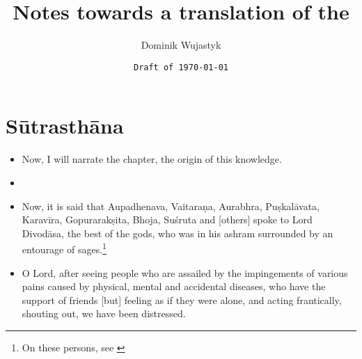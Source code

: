 \documentclass[12pt]{article}
\title{Notes towards a translation of the \SS}
\author{Dominik Wujastyk}
\date{\texttt{Draft of \today }}
\begin{document}
       
    
    \nocite{forb-1856}
    \maketitle
    
    \section{Sūtrasthāna}
\begin{itemize}
    \item [1.1]
    Now, I will narrate the chapter, the origin of this knowledge.
    
%    
    
    \item[1.2]
    
    \item[1.3] Now, it is said that Aupadhenava, Vaitaraṇa, Aurabhra, Puṣkalāvata, Karavīra, 
    Gopurarakṣita, Bhoja, Suśruta and [others] spoke to Lord Divodāsa, the best of the gods, who was 
    in his ashram surrounded by an entourage of sages.\footnote{On these persons, see \cite[IA 
    369\,ff.]{meul-hist}}
    
    
    \item[1.4]
O Lord, after seeing people who are assailed by the impingements of various pains caused by 
physical, mental and accidental diseases, who have the support of friends [but] feeling as if they 
were alone, and acting frantically, shouting out, we have been distressed. 
    
    

\end{itemize}
\end{document}
